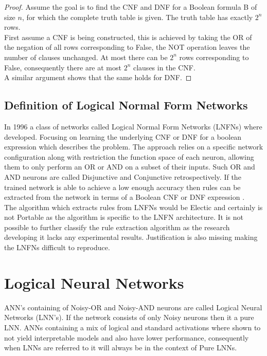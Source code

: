 \begin{proof}
	Assume the goal is to find the CNF and DNF for a Boolean formula B of size $n$, for which the complete truth table is given. The truth table has exactly $2^n$ rows.\\
	
	First assume a CNF is being constructed, this is achieved by taking the OR of the negation of all rows corresponding to False, the NOT operation leaves the number of clauses unchanged. At most there can be $2^n$ rows corresponding to False, consequently there are at most $2^n$ clauses in the CNF.\\
	
	A similar argument shows that the same holds for DNF.
\end{proof}

\subsection{Definition of Logical Normal Form Networks}
In 1996 a class of networks called Logical Normal Form Networks \cite{herrmann1996backpropagation} (LNFNs) where developed. Focusing on learning the underlying CNF or DNF for a boolean expression which describes the problem. The approach relies on a specific network configuration along with restriction the function space of each neuron, allowing them to only perform an OR or AND on a subset of their inputs. Such OR and AND neurons are called Disjunctive and Conjunctive retrospectively. If the trained network is able to achieve a low enough accuracy then rules can be extracted from the network in terms of a Boolean CNF or DNF expression \cite{herrmann1996backpropagation}.\\

The algorithm which extracts rules from LNFNs would be Electic and certainly is not Portable as the algorithm is specific to the LNFN architecture. It is not possible to further classify the rule extraction algorithm as the research developing it lacks any experimental results. Justification is also missing making the LNFNs difficult to reproduce.

\section{Logical Neural Networks}
ANN's containing of Noisy-OR and Noisy-AND neurons are called Logical Neural Networks \cite{LearningLogicalActivations} (LNN's). If the network consists of only Noisy neurons then it a pure LNN. ANNs containing a mix of logical and standard activations where shown to not yield interpretable models and also have lower performance, consequently when LNNs are referred to it will always be in the context of Pure LNNs.



